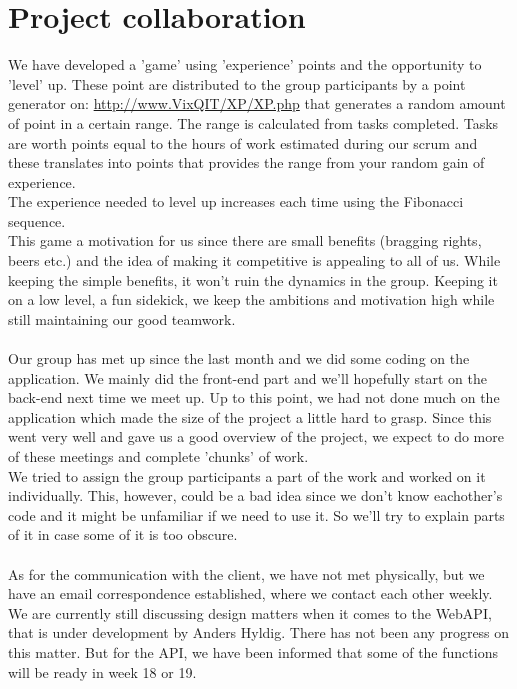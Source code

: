 \message{ !name(Rapport.tex)}\documentclass[12pt]{article}
\begin{document}
\section{Project collaboration}
We have developed a 'game' using 'experience' points and the opportunity to 'level' up. These point are distributed to the group participants by a point generator on: \url{http://www.VixQIT/XP/XP.php}
that generates a random amount of point in a certain range. The range is calculated from tasks completed. Tasks are worth points equal to the hours of work estimated during our scrum and these translates into points that provides the range from your random gain of experience.\\
The experience needed to level up increases each time using the Fibonacci sequence.\\
This game a motivation for us since there are small benefits (bragging rights, beers etc.) and the idea of making it competitive is appealing to all of us. While keeping the simple benefits, it won't ruin the dynamics in the group. Keeping it on a low level, a fun sidekick, we keep the ambitions and motivation high while still maintaining our good teamwork.\\
\\
Our group has met up since the last month and we did some coding on the application. We mainly did the front-end part and we'll hopefully start on the back-end next time we meet up. Up to this point, we had not done much on the application which made the size of the project a little hard to grasp. Since this went very well and gave us a good overview of the project, we expect to do more of these meetings and complete 'chunks' of work.\\
We tried to assign the group participants a part of the work and worked on it individually. This, however, could be a bad idea since we don't know eachother's code and it might be unfamiliar if we need to use it. So we'll try to explain parts of it in case some of it is too obscure.\\
\\
As for the communication with the client, we have not met physically, but we have an email correspondence established, where we contact each other weekly. We are currently still discussing design matters when it comes to the WebAPI, that is under development by Anders Hyldig. There has not been any progress on this matter. But for the API, we have been informed that some of the functions will be ready in week 18 or 19.

\newpage
\end{document}
